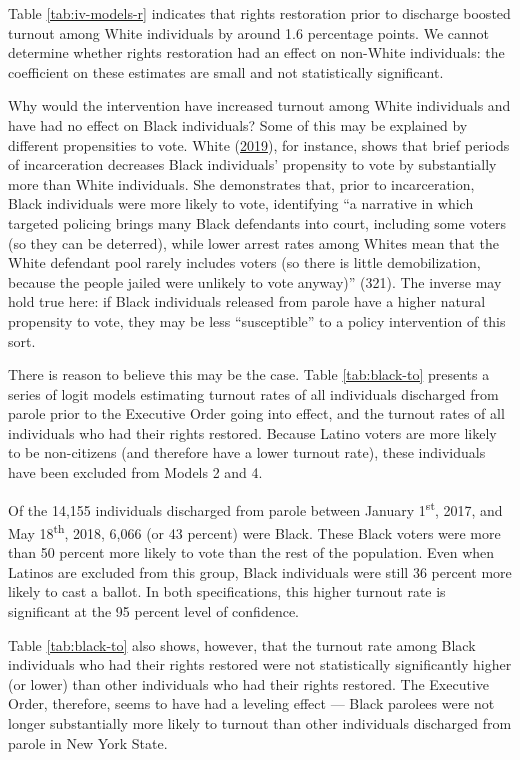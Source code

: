 \documentclass[]{article}
\begin{document}


Table \ref{tab:iv-models-r} indicates that rights restoration prior to discharge boosted turnout among White individuals by around 1.6 percentage points. We cannot determine whether rights restoration had an effect on non-White individuals: the coefficient on these estimates are small and not statistically significant.

Why would the intervention have increased turnout among White individuals and have had no effect on Black individuals? Some of this may be explained by different propensities to vote. White (\protect\hyperlink{ref-White2019}{2019}), for instance, shows that brief periods of incarceration decreases Black individuals' propensity to vote by substantially more than White individuals. She demonstrates that, prior to incarceration, Black individuals were more likely to vote, identifying ``a narrative in which targeted policing brings many Black defendants into court, including some voters (so they can be deterred), while lower arrest rates among Whites mean that the White defendant pool rarely includes voters (so there is little demobilization, because the people jailed were unlikely to vote anyway)'' (321). The inverse may hold true here: if Black individuals released from parole have a higher natural propensity to vote, they may be less ``susceptible'' to a policy intervention of this sort.

There is reason to believe this may be the case. Table \ref{tab:black-to} presents a series of logit models estimating turnout rates of all individuals discharged from parole prior to the Executive Order going into effect, and the turnout rates of all individuals who had their rights restored. Because Latino voters are more likely to be non-citizens (and therefore have a lower turnout rate), these individuals have been excluded from Models 2 and 4.



Of the 14,155 individuals discharged from parole between January 1\textsuperscript{st}, 2017, and May 18\textsuperscript{th}, 2018, 6,066 (or 43 percent) were Black. These Black voters were more than 50 percent more likely to vote than the rest of the population. Even when Latinos are excluded from this group, Black individuals were still 36 percent more likely to cast a ballot. In both specifications, this higher turnout rate is significant at the 95 percent level of confidence.

Table \ref{tab:black-to} also shows, however, that the turnout rate among Black individuals who had their rights restored were not statistically significantly higher (or lower) than other individuals who had their rights restored. The Executive Order, therefore, seems to have had a leveling effect --- Black parolees were not longer substantially more likely to turnout than other individuals discharged from parole in New York State.
\end{document}
